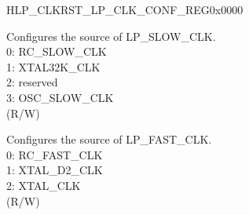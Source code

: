 \begin{register}{H}{LP\_CLKRST\_LP\_CLK\_CONF\_REG}{0x0000}\label{regdesc:LPCLKRSTLPCLKCONFREG}
%
%
%
%
\regnewline%
\begin{regdesc}\begin{reglist}
\label{fielddesc:LPCLKRSTSLOWCLKSEL}\item [LP\_CLKRST\_SLOW\_CLK\_SEL] Configures the source of LP\_SLOW\_CLK.\\
0: RC\_SLOW\_CLK \\
1: XTAL32K\_CLK \\
2: reserved \\
3: OSC\_SLOW\_CLK \\(R/W)
\label{fielddesc:LPCLKRSTFASTCLKSEL}\item [LP\_CLKRST\_FAST\_CLK\_SEL] Configures the source of LP\_FAST\_CLK.\\
0: RC\_FAST\_CLK \\
1: XTAL\_D2\_CLK \\
2: XTAL\_CLK \\ (R/W)
\end{reglist}\end{regdesc}
\end{register}


